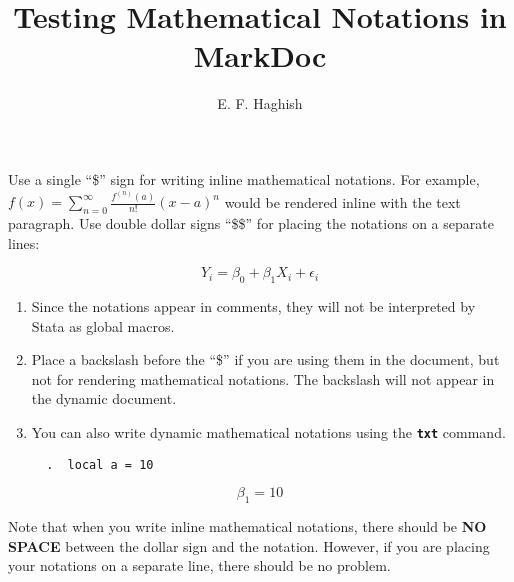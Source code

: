 \documentclass{article}
\begin{document}
\title{Testing Mathematical Notations in MarkDoc}
\author{E. F. Haghish } 
\maketitle


Use a single ``\$'' sign for writing inline mathematical notations. For
example, \(f(x)=\sum_{n=0}^\infty\frac{f^{(n)}(a)}{n!}(x-a)^n\) would be
rendered inline with the text paragraph. Use double dollar signs
``\$\$'' for placing the notations on a separate lines:

\[Y_i = \beta_0 + \beta_1 X_i + \epsilon_i\]

\begin{enumerate}
\def\labelenumi{\arabic{enumi}.}
\item
  Since the notations appear in comments, they will not be interpreted
  by Stata as global macros.
\item
  Place a backslash before the ``\$'' if you are using them in the
  document, but not for rendering mathematical notations. The backslash
  will not appear in the dynamic document.
\item
  You can also write dynamic mathematical notations using the
  \textbf{\texttt{txt}} command.

\begin{verbatim}
  .  local a = 10
\end{verbatim}
\end{enumerate}

\[ \beta_1 = 10 \]

Note that when you write inline mathematical notations, there should be
\textbf{NO SPACE} between the dollar sign and the notation. However, if
you are placing your notations on a separate line, there should be no
problem.
\end{document}
